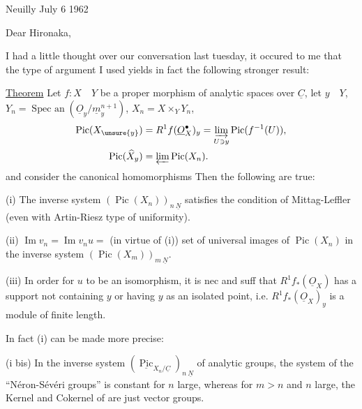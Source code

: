 
\begin{flushright}Neuilly July 6 1962\end{flushright}

Dear Hironaka,

I had a little thought over our conversation last tuesday, it occured to me that the type of argument I used yields in fact the following stronger result:

\uline{Theorem} Let $f:X\quad Y$ be a proper morphism of analytic spaces over $\underline{C}$, let $y\quad Y$, $Y_n=\operatorname{Spec\ an}(\underline{O}_y/\underline{m}_y^{n+1})$, $X_n=X\times_Y Y_n$,
\[
\begin{aligned}
\operatorname{Pic}(X_{\unsure{y}})&=R^1f(\underline{O}_X^{\bullet})_y=\underset{U\ni y}{\varinjlim}\operatorname{Pic}(f^{-1}(U)),\\
\operatorname{Pic}(\widehat{X}_y)&=\varprojlim\operatorname{Pic}(X_n).
\end{aligned}
\]
and consider the canonical homomorphisms
Then the following are true:

(i) The inverse system $(\operatorname{Pic}(X_n))_{n\ \underline{N}}$ satisfies the condition of Mittag-Leffler (even with Artin-Riesz type of uniformity).

(ii) $\operatorname{Im}v_n=\operatorname{Im}v_nu={}$ (in virtue of (i)) set of universal images of $\operatorname{Pic}(X_n)$ in the inverse system $(\operatorname{Pic}(X_m))_{m\ \underline{N}}$.

(iii) In order for $u$ to be an isomorphism, it is nec and suff that $R^1f_*(\underline{O}_X)$ has a support not containing $y$ or having $y$ as an isolated point, i.e. $R^1f_*(\underline{O}_X)_y$ is a module of finite length.

In fact (i) can be made more precise:

(i bis) In the inverse system $(\underline{\operatorname{Pic}}_{X_n/\underline{C}})_{n\ \underline{N}}$ of analytic groups, the system of the ``Néron-Sévéri groups'' is constant for $n$ large, whereas for $m>n$ and $n$ large, the Kernel and Cokernel of
are just vector groups.

